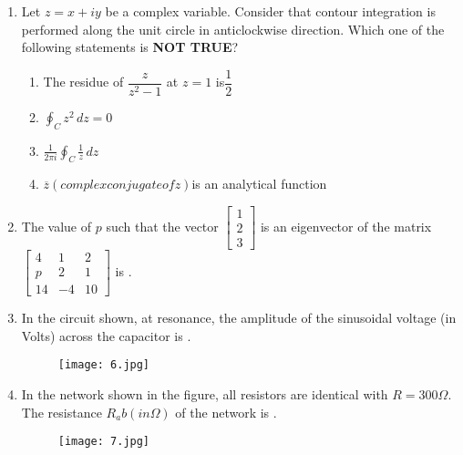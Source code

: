 \documentclass[12pt,-letter paper]{article}
\providecommand{\brak}[1]{\ensuremath{\left(#1\right)}}
\theoremstyle{remark}
\begin{document}
\begin{enumerate}
    \item Let $z=x+iy$ be a complex variable. Consider that contour integration is performed along the unit circle in anticlockwise direction. Which one of the following statements is \textbf{NOT TRUE}?
       \begin{enumerate}
           \item The residue of $\dfrac{z}{z^2-1}$ at $z=1$ is$\dfrac{1}{2}$
           \item \(\oint_C z^2\,dz =0\)\\
           \item \(\frac{1}{2\pi i}\oint_C \frac{1}{z}\,dz\)\\
           \item $\overline{z} \brak{complex conjugate of z}$is an analytical function
       \end{enumerate}
    \item The value of $p$ such that the vector 
    $\begin{bmatrix}
       1\\
       2\\
       3
    \end{bmatrix}$ is an eigenvector of the matrix
    $\begin{bmatrix}
        4 & 1 & 2\\
        p & 2 & 1\\
        14 & -4 & 10
    \end{bmatrix}$ is \underline{\hspace{1cm}}.
    \item In the circuit shown, at resonance, the amplitude of the sinusoidal voltage (in Volts) across the capacitor is \underline{\hspace{1cm}}.
    \begin{figure}[h]
        \centering
        \texttt{[image: 6.jpg]}        
    \end{figure}
    
    \item In the network shown in the figure, all resistors are identical with $R=300\Omega$. The resistance $R_ab \brak{in\Omega}$ of the network is \underline{\hspace{1cm}}.
    \begin{figure}[h]
        \centering
        \texttt{[image: 7.jpg]}
    \end{figure}
  

\end{enumerate}
\end{document}
